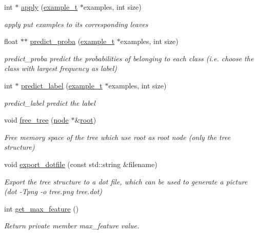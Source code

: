 \begin{DoxyCompactItemize}
int $\ast$ \hyperlink{classtree_a362a7d5706211843e3bfc4b962df5a34}{apply} (\hyperlink{classexample__t}{example\+\_\+t} $\ast$examples, int size)
\begin{DoxyCompactList}\small\item\em apply put examples to its corresponding leaves \end{DoxyCompactList}\item 
float $\ast$$\ast$ \hyperlink{classtree_ab240deb992061738a7d9dff311f7f0c9}{predict\+\_\+proba} (\hyperlink{classexample__t}{example\+\_\+t} $\ast$examples, int size)
\begin{DoxyCompactList}\small\item\em predict\+\_\+proba predict the probabilities of belonging to each class (i.\+e. choose the class with largest frequency as label) \end{DoxyCompactList}\item 
int $\ast$ \hyperlink{classtree_af1031209a57f82b1010fa70c6ec4bd84}{predict\+\_\+label} (\hyperlink{classexample__t}{example\+\_\+t} $\ast$examples, int size)
\begin{DoxyCompactList}\small\item\em predict\+\_\+label predict the label \end{DoxyCompactList}\item 
void \hyperlink{classtree_ae92bd57b719a2575d9fec46f514cbbe9}{free\+\_\+tree} (\hyperlink{classnode}{node} $\ast$\&\hyperlink{classtree_ad397d4906e47149b98f769b3e81473ee}{root})
\begin{DoxyCompactList}\small\item\em Free memory space of the tree which use {\ttfamily root} as root node (only the tree structure) \end{DoxyCompactList}\item 
void \hyperlink{classtree_abc6048c70de7490eabf2433d46067b7b}{export\+\_\+dotfile} (const std\+::string \&filename)
\begin{DoxyCompactList}\small\item\em Export the tree structure to a dot file, which can be used to generate a picture (dot -\/\+Tpng -\/o tree.\+png tree.\+dot) \end{DoxyCompactList}\item 
int \hyperlink{classtree_a8042d0897915fdfeeca4b4d75515b96c}{get\+\_\+max\+\_\+feature} ()
\begin{DoxyCompactList}\small\item\em Return private member {\ttfamily max\+\_\+feature} value. \end{DoxyCompactList}\end{DoxyCompactItemize}
